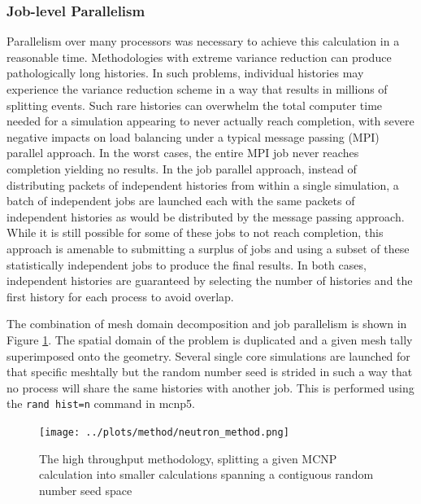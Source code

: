 \documentclass[12pt]{article}
\begin{document}
\subsubsection{Job-level Parallelism}
Parallelism over many processors was necessary to achieve this calculation in
a reasonable time. Methodologies with extreme variance reduction can produce
pathologically long histories.  In such problems, individual histories may
experience the variance reduction scheme in a way that results in millions of
splitting events.  Such rare histories can overwhelm the total computer time
needed for a simulation appearing to never actually reach completion, with
severe negative impacts on load balancing under a typical message passing
(MPI) parallel approach.  In the worst cases, the entire MPI job never reaches
completion yielding no results.  In the job parallel approach, instead of
distributing packets of independent histories from within a single simulation,
a batch of independent jobs are launched each with the same packets of
independent histories as would be distributed by the message passing approach.  
While it is still possible for some of these jobs to
not reach completion, this approach is amenable to submitting a surplus of
jobs and using a subset of these statistically independent jobs to produce the
final results.  In both cases, independent histories are guaranteed by
selecting the number of histories and the first history for each process to
avoid overlap.  

The combination of mesh domain decomposition and job parallelism is shown in
Figure \ref{fig:mesh_splitting}.  
The spatial domain of the problem is duplicated and a given
mesh tally superimposed onto the geometry. Several single core simulations are
launched for that specific meshtally but the random number seed is strided in
such a way that no process will share the same histories with another job.  
This is performed using the \texttt{rand hist=n} command in \gls{mcnp5}.

\begin{figure}[ht!]
  \centering
  \texttt{[image: ../plots/method/neutron\_method.png]}
  \caption{The high throughput methodology, splitting a given MCNP calculation
           into smaller calculations spanning a contiguous random number seed
           space}
  \label{fig:mesh_splitting}
\end{figure}
\end{document}
